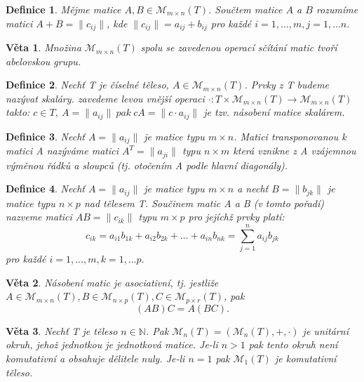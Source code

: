\documentclass[12pt,a4paper]{article}
\newtheorem{definition}{Definice}
\newtheorem{sentence}{Věta}
\begin{document}
\begin{definition}
	Mějme matice $A,B \in \mathscr{M}_{m \times n}(T)$. Součtem matice $A$ a $B$ rozumíme matici $A + B = \|c_{ij}\|$, kde $ \|c_{ij}\| =  a_{ij} + b_{ij}$ pro každé $i = 1, \dots, m, j = 1, \dots n.$
\end{definition}

\begin{sentence}
	Množina $\mathscr{M}_{m \times n}(T)$ spolu se zavedenou operací sčítání matic tvoří abelovskou grupu.
\end{sentence}
\begin{definition}
	Nechť T je číselné těleso, $A \in \mathscr{M}_{m \times n}(T)$. Prvky z T budeme nazývat skaláry. zavedeme levou vnější operaci $\cdot : T \times  \mathscr{M}_{m \times n}(T) \rightarrow \mathscr{M}_{m \times n}(T)$ takto: $c \in T, \ A= \| a_{ij} \| \ pak \ cA = \|c \cdot a_{ij} \|$ je tzv. násobení matice skalárem.
\end{definition}

\begin{definition}
	Nechť $A= \| a_{ij} \|$ je matice typu $m \times n$. Matici transponovanou k matici A nazýváme matici $A^T = \| a_{ji} \|$ typu $n \times m$ která vznikne z A vzájemnou výměnou řádků a sloupců (tj. otočením A podle hlavní diagonály).
\end{definition}

\begin{definition}
	Nechť $A= \| a_{ij} \|$ je matice typu $m \times n$ a nechť $B= \| b_{jk} \|$ je matice typu $n \times p$  nad tělesem T. Součinem matic A a B (v tomto pořadí) nazveme matici $AB =  \| c_{ik} \|$ typu $m \times p$ pro jejíchž prvky platí: $$c_{ik} = a_{i1}b_{1k} + a_{i2}b_{2k} + \dots + a_{in}b_{nk} = \sum^n_{j=1} a_{ij}b_{jk}$$
	pro každé $i = 1, \dots, m, k = 1, \dots p.$
\end{definition}

\begin{sentence}
	Násobení matic je asociativní, tj. jestliže $A \in \mathscr{M}_{m \times n}(T), B \in \mathscr{M}_{n \times p}(T), C \in \mathscr{M}_{p \times r}(T)$, pak $$(AB)C = A(BC).$$
\end{sentence}

\begin{sentence}
	Nechť T je těleso $n \in \mathbb{N}$. Pak $ \mathscr{M}_{n}(T) = (\mathscr{M}_{n}(T) ,+,\cdot)$ je unitární okruh, jehož jednotkou je jednotková matice. Je-li $n > 1$ pak tento okruh není komutativní a obsahuje dělitele nuly. Je-li $n = 1$ pak $\mathscr{M}_{1}(T)$  je komutativní těleso.
\end{sentence}
\end{document}

